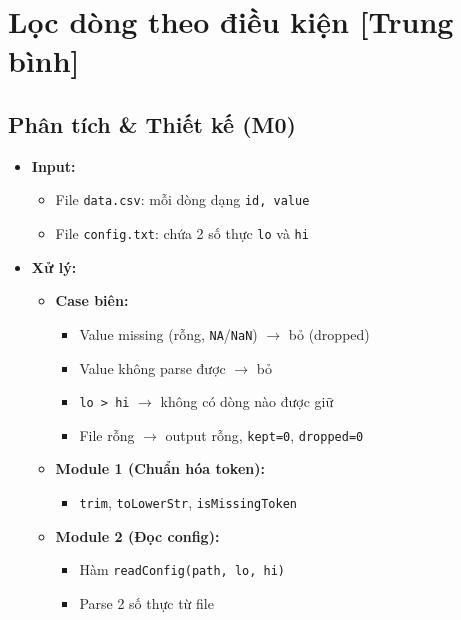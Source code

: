 \section{Lọc dòng theo điều kiện [Trung bình]}

\subsection{Phân tích \& Thiết kế (M0)}
\begin{itemize}
    \item \textbf{Input:}
    \begin{itemize}
        \item File \texttt{data.csv}: mỗi dòng dạng \texttt{id, value}
        \item File \texttt{config.txt}: chứa 2 số thực \texttt{lo} và \texttt{hi}
    \end{itemize}

    \item \textbf{Xử lý:}
    \begin{itemize}
        \item \textbf{Case biên:}
        \begin{itemize}
            \item Value missing (rỗng, \texttt{NA}/\texttt{NaN}) $\rightarrow$ bỏ (dropped)
            \item Value không parse được $\rightarrow$ bỏ
            \item \texttt{lo > hi} $\rightarrow$ không có dòng nào được giữ
            \item File rỗng $\rightarrow$ output rỗng, \texttt{kept=0}, \texttt{dropped=0}
        \end{itemize}

        \item \textbf{Module 1 (Chuẩn hóa token):}
        \begin{itemize}
            \item \texttt{trim}, \texttt{toLowerStr}, \texttt{isMissingToken}
        \end{itemize}

        \item \textbf{Module 2 (Đọc config):}
        \begin{itemize}
            \item Hàm \texttt{readConfig(path, lo, hi)}
            \item Parse 2 số thực từ file
        \end{itemize}


\end{itemize}
\end{itemize}
